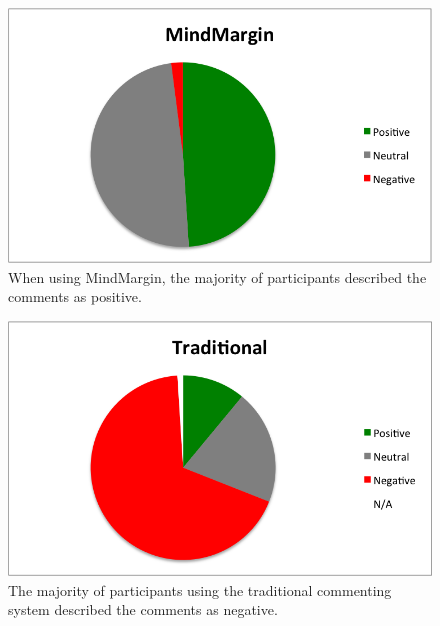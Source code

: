 \begin{figure}
\centering
\includegraphics[scale=0.5]{mm_piechart.png}
\caption{When using MindMargin, the majority of participants described the comments as positive.}
\label{fig:mm_pie}
\end{figure}

\begin{figure}
\centering
\includegraphics[scale=0.5]{traditional_piechart.png}
\caption{The majority of participants using the traditional commenting system described the comments as negative.}
\label{fig:trad_pie}
\end{figure}

